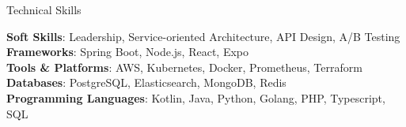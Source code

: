 \documentclass[
	10pt, %
]{resume} %
\begin{document}
\begin{rSection}{Technical Skills}

    \textbf{Soft Skills}: Leadership, Service-oriented Architecture, API Design, A/B Testing \\
    \textbf{Frameworks}: Spring Boot, Node.js, React, Expo \\
    \textbf{Tools \& Platforms}: AWS, Kubernetes, Docker, Prometheus, Terraform \\
    \textbf{Databases}: PostgreSQL, Elasticsearch, MongoDB, Redis \\
    \textbf{Programming Languages}: Kotlin, Java, Python, Golang, PHP, Typescript, SQL \\

\end{rSection}






\end{document}
